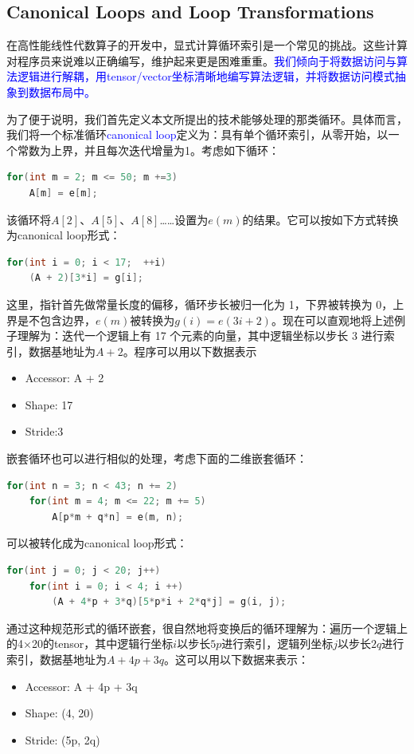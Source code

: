 \documentclass{article}
\begin{document}
\subsection{Canonical Loops and Loop Transformations}
在高性能线性代数算子的开发中，显式计算循环索引是一个常见的挑战。这些计算对程序员来说难以正确编写，维护起来更是困难重重。\textcolor{blue}{我们倾向于将数据访问与算法逻辑进行解耦，用tensor/vector坐标清晰地编写算法逻辑，并将数据访问模式抽象到数据布局中。}

为了便于说明，我们首先定义本文所提出的技术能够处理的那类循环。具体而言，我们将一个标准循环\textcolor{blue}{canonical loop}定义为：具有单个循环索引，从零开始，以一个常数为上界，并且每次迭代增量为1。考虑如下循环：
\begin{lstlisting}[language=C++]
for(int m = 2; m <= 50; m +=3)
    A[m] = e[m];
\end{lstlisting}
该循环将$A[2]、A[5]、A[8]$……设置为$e(m)$的结果。它可以按如下方式转换为canonical loop形式：
\begin{lstlisting}[language=C++]
for(int i = 0; i < 17;  ++i)
    (A + 2)[3*i] = g[i];
\end{lstlisting}
这里，指针首先做常量长度的偏移，循环步长被归一化为 1，下界被转换为 0，上界是不包含边界，$e(m)$被转换为$g(i) = e(3i+2)$。现在可以直观地将上述例子理解为：迭代一个逻辑上有 17 个元素的向量，其中逻辑坐标以步长 3 进行索引，数据基地址为$A+2$。程序可以用以下数据表示
\begin{itemize}
    \item Accessor: A + 2
    \item Shape: 17
    \item Stride:3
\end{itemize}
嵌套循环也可以进行相似的处理，考虑下面的二维嵌套循环：
\begin{lstlisting}[language=C++]
for(int n = 3; n < 43; n += 2) 
    for(int m = 4; m <= 22; m += 5)
        A[p*m + q*n] = e(m, n);
\end{lstlisting}
可以被转化成为canonical loop形式：
\begin{lstlisting}[language=C++]
for(int j = 0; j < 20; j++)
    for(int i = 0; i < 4; i ++)
        (A + 4*p + 3*q)[5*p*i + 2*q*j] = g(i, j);
\end{lstlisting}
通过这种规范形式的循环嵌套，很自然地将变换后的循环理解为：遍历一个逻辑上的4×20的tensor，其中逻辑行坐标$i$以步长$5p$进行索引，逻辑列坐标$j$以步长$2q$进行索引，数据基地址为$A+4p+3q$。这可以用以下数据来表示：
\begin{itemize}
    \item Accessor: A + 4p + 3q
    \item Shape: (4, 20)
    \item Stride: (5p, 2q)
\end{itemize}
\end{document}
